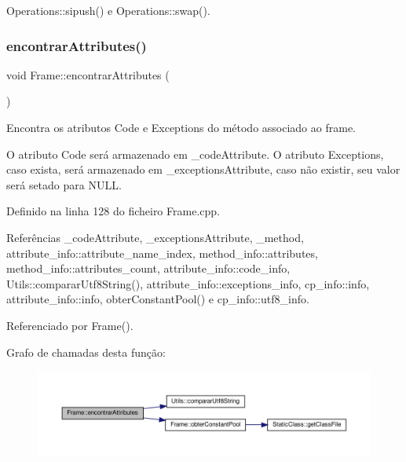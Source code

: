 Operations\+::sipush() e Operations\+::swap().

\mbox{\label{classFrame_a6950091ee708f622befdfcc7c35b7025}} 
\subsubsection{\texorpdfstring{encontrar\+Attributes()}{encontrarAttributes()}}
{\footnotesize\ttfamily void Frame\+::encontrar\+Attributes (\begin{DoxyParamCaption}{ }\end{DoxyParamCaption})\hspace{0.3cm}{\ttfamily [private]}}



Encontra os atributos Code e Exceptions do método associado ao frame. 

O atributo Code será armazenado em {\ttfamily \+\_\+code\+Attribute}. O atributo Exceptions, caso exista, será armazenado em {\ttfamily \+\_\+exceptions\+Attribute}, caso não existir, seu valor será setado para {\ttfamily N\+U\+LL}. 

Definido na linha 128 do ficheiro Frame.\+cpp.



Referências \+\_\+code\+Attribute, \+\_\+exceptions\+Attribute, \+\_\+method, attribute\+\_\+info\+::attribute\+\_\+name\+\_\+index, method\+\_\+info\+::attributes, method\+\_\+info\+::attributes\+\_\+count, attribute\+\_\+info\+::code\+\_\+info, Utils\+::comparar\+Utf8\+String(), attribute\+\_\+info\+::exceptions\+\_\+info, cp\+\_\+info\+::info, attribute\+\_\+info\+::info, obter\+Constant\+Pool() e cp\+\_\+info\+::utf8\+\_\+info.



Referenciado por Frame().

Grafo de chamadas desta função\+:\nopagebreak
\begin{figure}[H]
\begin{center}
\leavevmode
\includegraphics[width=350pt]{classFrame_a6950091ee708f622befdfcc7c35b7025_cgraph}
\end{center}
\end{figure}
\mbox{\label{classFrame_a6863584ef3a6f2e4b1f93fb0deb09f4b}} 
